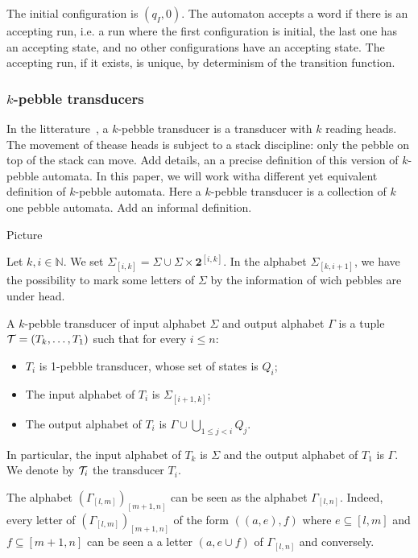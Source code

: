 
The initial configuration is $(q_I, 0)$. The automaton accepts a word if there is an accepting run,
i.e. a run where the first configuration is initial, the last one has an accepting
state, and no other configurations have an accepting state. The accepting run, if it exists, is unique, by determinism of the transition function.


\subsubsection{$k$-pebble transducers}

In the litterature~\cite{}, a $k$-pebble transducer is a transducer with $k$ reading heads. The movement of thease heads is subject to a stack discipline: only the pebble on top of the stack can move. Add details, an a precise definition of this version of $k$-pebble automata. 
In this paper, we will work witha different yet equivalent definition of $k$-pebble automata. Here a $k$-pebble transducer is a collection of $k$ one pebble automata. Add an informal definition.
\begin{center}
Picture
\end{center}
Let $k, i\in \mathbb{N}$. We set $\Sigma_{[i,k]}=\Sigma\cup\Sigma\times \mathbf 2^{[i,k]}$.  
In the alphabet $\Sigma_{[k, i+1]}$, we have the possibility to mark some letters of $\Sigma$ by the information of wich pebbles are under head. 

 
\begin{definition}%
A $k$-pebble transducer of input alphabet $\Sigma$ and output alphabet $\Gamma$ is a tuple ${\mathcal T}=(T_k,\dots,T_{1})$ such that for every $i\leq n$:
\begin{itemize}
\item  $T_i$ is 1-pebble transducer, whose set of states is $Q_i$;
\item  The input alphabet of $T_i$ is $\Sigma_{[i+1,k]}$;
\item  The output alphabet of $T_i$ is $\Gamma\cup\bigcup_{1\leq j <i } Q_j$.
\end{itemize} 
In particular, the input alphabet of $T_k$ is $\Sigma$ and the output alphabet of $T_1$ is $\Gamma$. We denote by ${\mathcal T}_i$ the transducer $T_i$. 
\end{definition}

The alphabet $(\Gamma_{[l,m]})_{[m+1,n]}$ can be seen as the alphabet $\Gamma_{[l,n]}$. Indeed, every letter of $(\Gamma_{[l,m]})_{[m+1,n]}$ of the form $((a,e),f)$ where $e\subseteq [l,m]$ and 
$f\subseteq [m+1,n]$ can be seen a a letter $(a,e\cup f)$ of $\Gamma_{[l,n]}$ and conversely.

